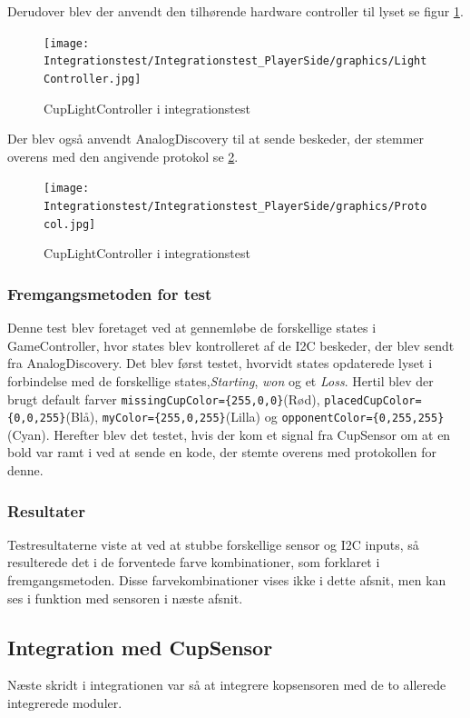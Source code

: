\documentclass[Integrationstest/Integrationstest_main.tex]{subfiles}
\begin{document}
Derudover blev der anvendt den tilhørende hardware controller til lyset se figur \ref{fig:CupLightCtrl_integration}.

\begin{figure}[H]
    \centering
    \texttt{[image: Integrationstest/Integrationstest\_PlayerSide/graphics/LightController.jpg]}
    \caption{CupLightController i integrationstest}
    \label{fig:CupLightCtrl_integration}
\end{figure}

Der blev også anvendt AnalogDiscovery til at sende beskeder, der stemmer overens med den angivende protokol se \ref{fig:Protocol_integration}.
\begin{figure}[H]
    \centering
    \texttt{[image: Integrationstest/Integrationstest\_PlayerSide/graphics/Protocol.jpg]}
    \caption{CupLightController i integrationstest}
    \label{fig:Protocol_integration}
\end{figure}
\subsubsection{Fremgangsmetoden for test}
Denne test blev foretaget ved at gennemløbe de forskellige states i GameController, hvor states blev kontrolleret af de I2C beskeder, der blev sendt fra AnalogDiscovery. Det blev først testet, hvorvidt states opdaterede lyset i forbindelse med de forskellige states,\textit{Starting}, \textit{won} og et \textit{Loss}. Hertil blev der brugt default farver \lstinline|missingCupColor={255,0,0}|(Rød), \lstinline|placedCupColor={0,0,255}|(Blå), \lstinline|myColor={255,0,255}|(Lilla) og \lstinline|opponentColor={0,255,255}|(Cyan). Herefter blev det testet, hvis der kom et signal fra CupSensor om at en bold var ramt i ved at sende en kode, der stemte overens med protokollen for denne. 

\subsubsection{Resultater}
Testresultaterne viste at ved at stubbe forskellige sensor og I2C inputs, så resulterede det i de forventede farve kombinationer, som forklaret i fremgangsmetoden. Disse farvekombinationer vises ikke  i dette afsnit, men kan ses i funktion med sensoren i næste afsnit.

\subsection{Integration med CupSensor}
Næste skridt i integrationen var så at integrere kopsensoren med de to allerede integrerede moduler. 
\end{document}
